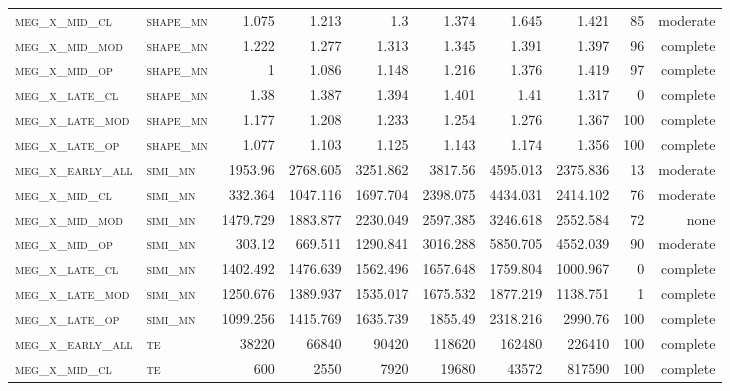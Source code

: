 \begin{landscape}
\begin{center}
\begin{footnotesize}
\begin{longtable}{llrrrrr|rrr}
\textsc{meg\_x\_mid\_cl   } & \textsc{shape\_mn }    & 1.075    & 1.213    & 1.3      & 1.374    & 1.645    & 1.421    & 85  & moderate \\
\textsc{meg\_x\_mid\_mod  } & \textsc{shape\_mn }    & 1.222    & 1.277    & 1.313    & 1.345    & 1.391    & 1.397    & 96  & complete \\
\textsc{meg\_x\_mid\_op   } & \textsc{shape\_mn }    & 1        & 1.086    & 1.148    & 1.216    & 1.376    & 1.419    & 97  & complete \\
\textsc{meg\_x\_late\_cl  } & \textsc{shape\_mn }    & 1.38     & 1.387    & 1.394    & 1.401    & 1.41     & 1.317    & 0   & complete \\
\textsc{meg\_x\_late\_mod } & \textsc{shape\_mn }    & 1.177    & 1.208    & 1.233    & 1.254    & 1.276    & 1.367    & 100 & complete \\
\textsc{meg\_x\_late\_op  } & \textsc{shape\_mn }    & 1.077    & 1.103    & 1.125    & 1.143    & 1.174    & 1.356    & 100 & complete \\
\textsc{meg\_x\_early\_all} & \textsc{simi\_mn  }    & 1953.96  & 2768.605 & 3251.862 & 3817.56  & 4595.013 & 2375.836 & 13  & moderate \\
\textsc{meg\_x\_mid\_cl   } & \textsc{simi\_mn  }    & 332.364  & 1047.116 & 1697.704 & 2398.075 & 4434.031 & 2414.102 & 76  & moderate \\
\textsc{meg\_x\_mid\_mod  } & \textsc{simi\_mn  }    & 1479.729 & 1883.877 & 2230.049 & 2597.385 & 3246.618 & 2552.584 & 72  & none     \\
\textsc{meg\_x\_mid\_op   } & \textsc{simi\_mn  }    & 303.12   & 669.511  & 1290.841 & 3016.288 & 5850.705 & 4552.039 & 90  & moderate \\
\textsc{meg\_x\_late\_cl  } & \textsc{simi\_mn  }    & 1402.492 & 1476.639 & 1562.496 & 1657.648 & 1759.804 & 1000.967 & 0   & complete \\
\textsc{meg\_x\_late\_mod } & \textsc{simi\_mn  }    & 1250.676 & 1389.937 & 1535.017 & 1675.532 & 1877.219 & 1138.751 & 1   & complete \\
\textsc{meg\_x\_late\_op  } & \textsc{simi\_mn  }    & 1099.256 & 1415.769 & 1635.739 & 1855.49  & 2318.216 & 2990.76  & 100 & complete \\
\textsc{meg\_x\_early\_all} & \textsc{te  		}    & 38220    & 66840    & 90420    & 118620   & 162480   & 226410   & 100 & complete \\
\textsc{meg\_x\_mid\_cl   } & \textsc{te  		}    & 600      & 2550     & 7920     & 19680    & 43572    & 817590   & 100 & complete \\

\end{longtable}
\end{footnotesize}
\end{center}
\end{landscape}
